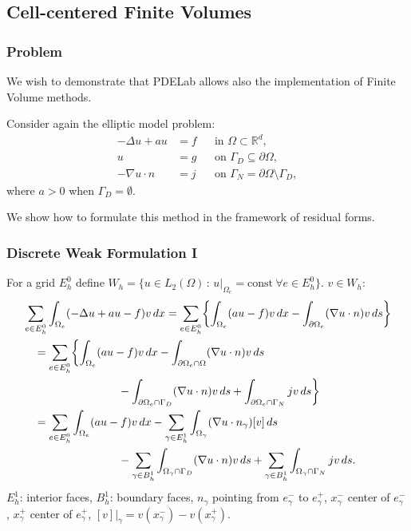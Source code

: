 \subsection{Cell-centered Finite Volumes}

\begin{frame}
\frametitle{Problem}
We wish to demonstrate that PDELab allows also the implementation of Finite Volume methods.

Consider again the elliptic model problem:
\begin{subequations} \label{Eq:Example04}
\begin{align}
 -\Delta u + a u  &= f &&\text{in $\Omega\subset\mathbb{R}^d$},\\
                u &= g &&\text{on $\Gamma_D\subseteq\partial\Omega$},\\
-\nabla u \cdot n &= j &&\text{on $\Gamma_N=\partial\Omega\setminus\Gamma_D$},
\end{align}
\end{subequations}
where $a>0$ when $\Gamma_D=\emptyset$.

We show how to formulate this method in the framework of residual forms.
\end{frame}

\begin{frame}
\frametitle{Discrete Weak Formulation I}
For a grid $E_h^0$ define $W_h = \{ u \in L_2(\Omega) \,:\,
u|_{\Omega_e} = \text{const} \ \forall e\in E_h^0\}$. $v\in W_h$:
{\small\begin{equation*}
\begin{split}
& \sum_{e\in E_h^0} \int_{\Omega_e} (-\Delta u + au - f) v \, dx =
\sum_{e\in E_h^0} \biggl\{ \int_{\Omega_e} (au - f) v \, dx -
\int_{\partial\Omega_e} (\nabla u\cdot n) v \, ds \biggr\}\\
&\quad = \sum_{e\in E_h^0} \biggl\{ \int_{\Omega_e} (au - f) v \, dx
- \int_{\partial\Omega_e\cap\Omega} (\nabla u\cdot n) v \, ds\\
&\hspace{30mm} - \int_{\partial\Omega_e\cap\Gamma_D} (\nabla u\cdot n) v \, ds
+ \int_{\partial\Omega_e\cap\Gamma_N} j v \, ds \biggr\}\\
&\quad = \sum_{e\in E_h^0} \int_{\Omega_e} (au - f) v \, dx
- \sum_{\gamma\in E_h^1} \int_{\Omega_\gamma} (\nabla u\cdot n_\gamma) [v] \, ds\\
&\hspace{30mm} - \sum_{\gamma\in B_h^1} \int_{\Omega_\gamma\cap\Gamma_D} (\nabla u\cdot n) v \, ds
+ \sum_{\gamma\in B_h^1} \int_{\Omega_\gamma\cap\Gamma_N} j v \, ds .
\end{split}
\end{equation*}}
$E_h^1$: interior faces, $B_h^1$: boundary faces, $n_\gamma$ pointing from $e^-_\gamma$ to $e^+_\gamma$,
$x_\gamma^-$ center of $e_\gamma^-$, $x_\gamma^+$ center of $e_\gamma^+$, $[v]|_\gamma = v(x_\gamma^-) - v(x_\gamma^+)$.
\end{frame}


